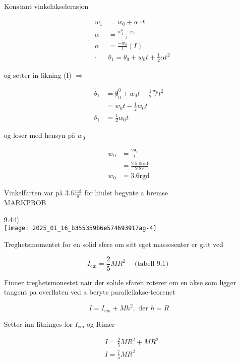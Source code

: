 \documentclass[10pt]{article}
\begin{document}
Konstant vinkelakselerasjon

$$
\text { - } \begin{aligned}
w_{1} & =w_{0}+\alpha \cdot t \\
\alpha & =\frac{w_{1}^{0}-w_{0}}{t} \\
\alpha & =\frac{-w_{0}}{t}(I) \\
\cdot & \theta_{1}=\theta_{0}+w_{0} t+\frac{1}{2} \alpha t^{2}
\end{aligned}
$$

og setter in likning (I) $\Rightarrow$

$$
\begin{aligned}
\theta_{1} & =\not \theta_{0}^{0}+w_{0} t-\frac{1}{2} \frac{w_{0}}{t} t^{2} \\
& =w_{0} t-\frac{1}{2} w_{0} t \\
\theta_{1} & =\frac{1}{2} w_{0} t
\end{aligned}
$$

og loser med hensyn pä $w_{0}$

$$
\begin{aligned}
w_{0} & =\frac{2 \theta_{1}}{t} \\
& =\frac{2.5 .0 \mathrm{rad}}{2.8 \mathrm{~s}} \\
w_{0} & =3.6 \mathrm{rgd}
\end{aligned}
$$

Vinkelfarten var pà $3.6 \frac{\mathrm{rad}}{\mathrm{s}}$ for hiulet begynte a bremse\\

MARKPROB

9.44)\\
\texttt{[image: 2025\_01\_16\_b355359b6e574693917ag-4]}

Treghetsmomentet for en solid sfere om sitt eget massesenter er gitt ved

$$
I_{\mathrm{cm}}=\frac{2}{5} M R^{2} \quad \text { (tabell 9.1) }
$$

Finner treghetsmonestet nair der solide sfaren roterer om en akse som ligger tangent pa overflaten ved a berytc parallellakse-teorenet

$$
I=I_{c m}+M h^{2}, \text { der } h=R
$$

Setter inn litninges for $I_{\mathrm{cm}}$ og Rimer

$$
\begin{aligned}
& I=\frac{2}{5} M R^{2}+M R^{2} \\
& I=\frac{7}{5} M R^{2}
\end{aligned}
$$
\end{document}
